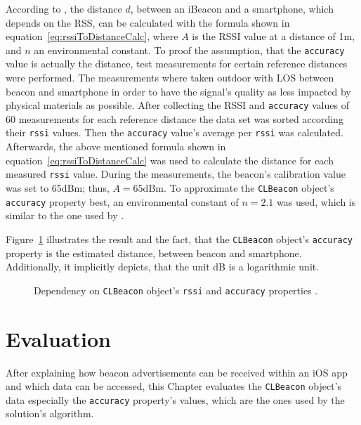 According to \citet{wang:bt_pos}, the distance $d$, between an iBeacon and a smartphone, which depends on the \acl{RSS}, can be calculated with the formula shown in equation~\ref{eq:rssiToDistanceCalc}, where $A$ is the \acs{RSSI} value at a distance of 1m, and $n$ an environmental constant. To proof the assumption, that the \texttt{accuracy} value is actually the distance, test measurements for certain reference distances were performed. The measurements where taken outdoor with \ac{LOS} between beacon and smartphone in order to have the signal's quality as less impacted by physical materials as possible. After collecting the \acs{RSSI} and \texttt{accuracy} values of 60 measurements for each reference distance the data set was sorted according their \texttt{rssi} values. Then the \texttt{accuracy} value's average per \texttt{rssi} was calculated. Afterwards, the above mentioned formula shown in equation~\ref{eq:rssiToDistanceCalc} was used to calculate the distance for each measured \texttt{rssi} value. During the measurements, the beacon's calibration value was set to 65dBm; thus, $A = 65\text{dBm}$. To approximate the \texttt{CLBeacon} object's \texttt{accuracy} property best, an environmental constant of $n = 2.1$ was used, which is similar to the one used by \citet{wang:bt_pos}.

Figure~\ref{fig:eval_accuracy_vs_distance} illustrates the result and the fact, that the \texttt{CLBeacon} object's \texttt{accuracy} property is the estimated distance, between beacon and smartphone. Additionally, it implicitly depicts, that the unit dB is a logarithmic unit.

\begin{figure}
  
	\caption{Dependency on \texttt{CLBeacon} object's \texttt{rssi} and \texttt{accuracy} properties \citep{apple:ios_doc_cl,wang:bt_pos,kotanen:exp_local_pos_bt}.}
	\label{fig:eval_accuracy_vs_distance}
\end{figure}



\section{Evaluation}\label{sec:beacon_eval}
After explaining how beacon advertisements can be received within an iOS app and which data can be accessed, this Chapter evaluates the \texttt{CLBeacon} object's data especially the \texttt{accuracy} property's values, which are the ones used by the solution's algorithm.


